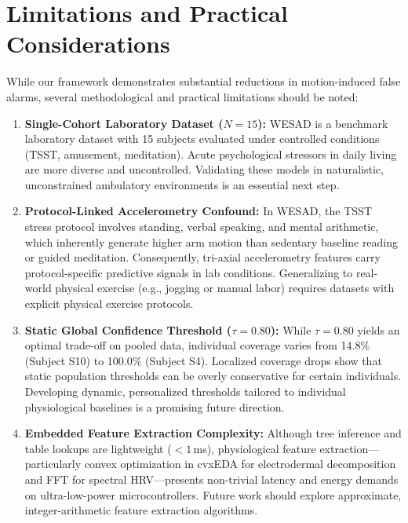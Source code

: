 \documentclass[conference]{IEEEtran}
\begin{document}
\section{Limitations and Practical Considerations}
While our framework demonstrates substantial reductions in motion-induced false alarms, several methodological and practical limitations should be noted:
\begin{enumerate}
    \item \textbf{Single-Cohort Laboratory Dataset ($N=15$):} WESAD is a benchmark laboratory dataset with 15 subjects evaluated under controlled conditions (TSST, amusement, meditation). Acute psychological stressors in daily living are more diverse and uncontrolled. Validating these models in naturalistic, unconstrained ambulatory environments is an essential next step.
    \item \textbf{Protocol-Linked Accelerometry Confound:} In WESAD, the TSST stress protocol involves standing, verbal speaking, and mental arithmetic, which inherently generate higher arm motion than sedentary baseline reading or guided meditation. Consequently, tri-axial accelerometry features carry protocol-specific predictive signals in lab conditions. Generalizing to real-world physical exercise (e.g., jogging or manual labor) requires datasets with explicit physical exercise protocols.
    \item \textbf{Static Global Confidence Threshold ($\tau = 0.80$):} While $\tau = 0.80$ yields an optimal trade-off on pooled data, individual coverage varies from 14.8\% (Subject S10) to 100.0\% (Subject S4). Localized coverage drops show that static population thresholds can be overly conservative for certain individuals. Developing dynamic, personalized thresholds tailored to individual physiological baselines is a promising future direction.
    \item \textbf{Embedded Feature Extraction Complexity:} Although tree inference and table lookups are lightweight ($< 1$\,ms), physiological feature extraction—particularly convex optimization in cvxEDA for electrodermal decomposition and FFT for spectral HRV—presents non-trivial latency and energy demands on ultra-low-power microcontrollers. Future work should explore approximate, integer-arithmetic feature extraction algorithms.
\end{enumerate}
\end{document}
